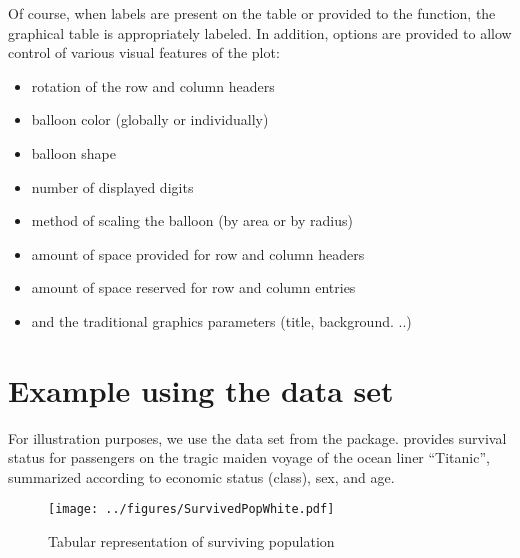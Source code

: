 \documentclass[a4paper]{report}
\begin{document}
\begin{article}
Of course, when labels are present on the table or provided to the
function, the graphical table is appropriately labeled.  In
addition, options are provided to allow control of various visual features
of the plot:

\begin{itemize}
  \item rotation of the row and column headers
  \item balloon color (globally or individually) 
  \item balloon shape 
  \item number of displayed digits
  \item method of scaling the balloon (by area or by radius)
  \item amount of space provided for row and column headers
  \item amount of space reserved for row and column entries
  \item and the traditional graphics parameters (title, background. ..)
\end{itemize}

\section*{Example using the  data set}

For illustration purposes, we use the  data set from
the  package.   provides survival status
for passengers on the tragic maiden voyage of the ocean liner
``Titanic'', summarized according to economic status (class), sex, and
age.




\begin{figure}
\texttt{[image: ../figures/SurvivedPopWhite.pdf]}
\vspace*{-0.25in}
\caption{\label{figure:Surv.Pop.White}
Tabular representation of surviving population}
\end{figure}



\end{article}
\end{document}
